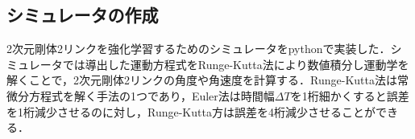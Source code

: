 \begin{small}
\subsection{シミュレータの作成}
2次元剛体2リンクを強化学習するためのシミュレータをpythonで実装した．シミュレータでは導出した運動方程式をRunge-Kutta法\cite{runge-kutta}により数値積分し運動学を解くことで，2次元剛体2リンクの角度や角速度を計算する．Runge-Kutta法は常微分方程式を解く手法の1つであり，Euler法は時間幅$\Delta T$を1桁細かくすると誤差を1桁減少させるのに対し，Runge-Kutta方は誤差を4桁減少させることができる．

\end{small}
